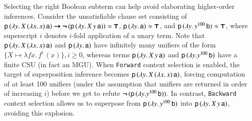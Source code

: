 \begin{exa}
  Selecting the right Boolean subterm can help avoid elaborating
  high\-er-order inferences. Consider the unsatisfiable clause set consisting of $\mathsf{p} \, (\lambda y.\, X
  \, (\lambda x.\, x) \, \mathsf{a}) \pmb{\rightarrow}\allowbreak \pmb{\neg\,}(\mathsf{p} \, (\lambda y. \allowbreak\, X
  \, y \, \mathsf{a})) \approx \pmb{\top}$, $\mathsf{p} \, (\lambda y.\, \mathsf{a}) \approx \pmb{\top}$, and
  $\mathsf{p} \, (\lambda y. \, y^{100} \, \mathsf{b}) \approx \pmb{\top}$, where superscript $i$ denotes $i$-fold
  application of a unary term.
  Note that $\mathsf{p} \, (\lambda y.\, X
  \, (\lambda x.\, x) \, \mathsf{a})$ and $\mathsf{p} \,
  (\lambda y.\, \mathsf{a})$ have infinitely many unifiers of the form $\{ X \mapsto \lambda fx.
  \, f^i\, (x) \}, i \geq 0$, whereas terms $\mathsf{p} \, (\lambda y. \, X
  \, y \, \mathsf{a})$ and $\mathsf{p} \, (\lambda y. y^{100} \, \mathsf{b})$ have a finite CSU (in fact an MGU). 
  When \texttt{Forward} context selection is enabled, 
  the target of superposition inference becomes $\mathsf{p} \, (\lambda y.\, X \, (\lambda x.\, x) \, \mathsf{a})$, 
  forcing computation of at least 100 unifiers (under the assumption that
  unifiers are returned in order of increasing $i$) before we get to refute
  $\pmb{\neg\,}(\mathsf{p} \, (\lambda y. y^{100} \, \mathsf{b}))$.
  In contrast, \texttt{Backward} context selection allows us to
  superpose from $\mathsf{p} \, (\lambda y. \, y^{100} \, \mathsf{b})$ into $\mathsf{p} \, (\lambda y. \, X
  \, y \, \mathsf{a})$, avoiding this explosion. 
\end{exa}


